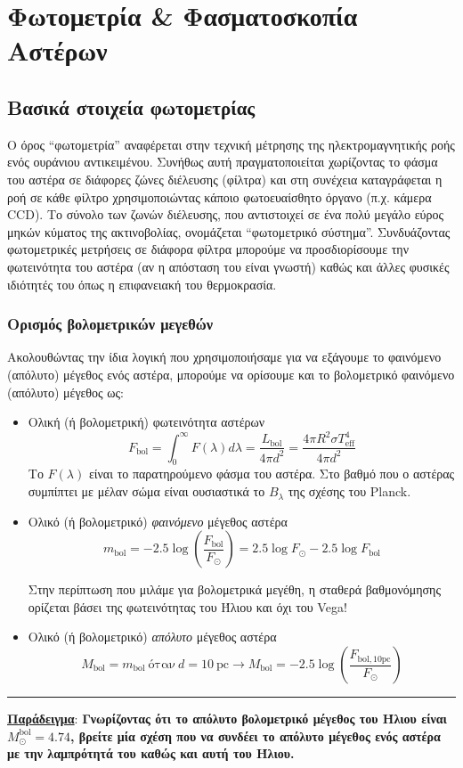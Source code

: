 \chapter{Φωτομετρία \& Φασματοσκοπία Αστέρων}
\label{ch:Chapter3}
{\hypersetup{linkcolor=black, pdfborder=0 0 1}
	\minitoc
}
\section{Βασικά στοιχεία φωτομετρίας} 
Ο όρος ``φωτομετρία'' αναφέρεται στην τεχνική μέτρησης της ηλεκτρομαγνητικής ροής ενός ουράνιου αντικειμένου. Συνήθως αυτή πραγματοποιείται χωρίζοντας το φάσμα του αστέρα σε διάφορες ζώνες διέλευσης (φίλτρα) και στη συνέχεια καταγράφεται η ροή σε κάθε φίλτρο χρησιμοποιώντας κάποιο φωτοευαίσθητο όργανο (π.χ. κάμερα CCD). Το σύνολο των ζωνών διέλευσης, που αντιστοιχεί σε ένα πολύ μεγάλο εύρος μηκών κύματος της ακτινοβολίας, ονομάζεται ``φωτομετρικό σύστημα''. 
Συνδυάζοντας φωτομετρικές μετρήσεις σε διάφορα φίλτρα μπορούμε να προσδιορίσουμε την φωτεινότητα του αστέρα (αν η απόσταση του είναι γνωστή) καθώς και άλλες φυσικές ιδιότητές του όπως η επιφανειακή του θερμοκρασία.

\subsection{Ορισμός βολομετρικών μεγεθών}
Ακολουθώντας την ίδια λογική που χρησιμοποιήσαμε για να εξάγουμε το φαινόμενο (απόλυτο) μέγεθος ενός αστέρα, μπορούμε να ορίσουμε και το βολομετρικό φαινόμενο (απόλυτο) μέγεθος ως:

\begin{itemize}
    \item Ολική (ή βολομετρική) φωτεινότητα αστέρων 
    $$F_{\text{bol}} = \int_0^{\infty}F(\lambda) d\lambda = \frac{L_{\text{bol}}}{4 \pi d^2} = \frac{4\pi R^2 \sigma T_{\text{eff}}^4}{4\pi d^2}$$
    Το $F(\lambda)$ είναι το παρατηρούμενο φάσμα του αστέρα. Στο βαθμό που ο αστέρας συμπίπτει με μέλαν σώμα είναι ουσιαστικά το $B_{\lambda}$ της σχέσης του Planck.
    \item Ολικό (ή βολομετρικό) \textit{φαινόμενο} μέγεθος αστέρα 
    $$m_{\text{bol}} = -2.5 \log \left( \frac{F_{\text{bol}}}{F_{\odot}} \right) = 2.5 \log F_{\odot} - 2.5 \log F_{\text{bol}}$$
    
    Στην περίπτωση που μιλάμε για βολομετρικά μεγέθη, η σταθερά βαθμονόμησης ορίζεται βάσει της φωτεινότητας του Ήλιου και όχι του Vega!
    \item Ολικό (ή βολομετρικό) \textit{απόλυτο} μέγεθος αστέρα
    $$M_{\text{bol}} = m_{\text{bol}} \ \text{όταν} \ d = 10 \ \text{pc} \longrightarrow M_{\text{bol}} = -2.5 \log \left( \frac{F_{\text{bol}, 10 \text{pc}}}{F_{\odot}} \right)$$
\end{itemize}
\hrule 
\underline{\textbf{Παράδειγμα}}:
\textbf{Γνωρίζοντας ότι το απόλυτο βολομετρικό μέγεθος του Ήλιου είναι $M_{\odot}^{\text{bol}} = 4.74$, βρείτε μία σχέση που να συνδέει το απόλυτο μέγεθος ενός αστέρα με την λαμπρότητά του καθώς και αυτή του Ήλιου.}


